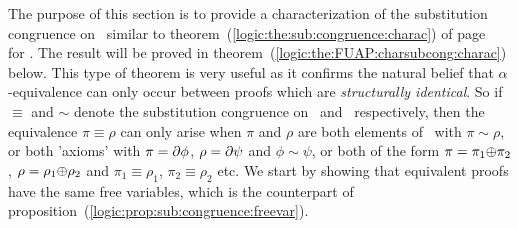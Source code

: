 The purpose of this section is to provide a characterization of the
substitution congruence on \pvs\ similar to
theorem~(\ref{logic:the:sub:congruence:charac}) of
page~\pageref{logic:the:sub:congruence:charac} for \pv. The result
will be proved in theorem~(\ref{logic:the:FUAP:charsubcong:charac})
below. This type of theorem is very useful as it confirms the
natural belief that $\alpha$-equivalence can only occur between
proofs which are {\em structurally identical}. So if $\equiv$ and
$\sim$ denote the substitution congruence on \pvs\ and \pv\
respectively, then the equivalence $\pi\equiv\rho$ can only arise
when $\pi$ and $\rho$ are both elements of \pv\ with $\pi\sim\rho$,
or both 'axioms' with $\pi=\mbox{$\partial$}\phi$, $\rho=\mbox{$\partial$}\psi$ and
$\phi\sim\psi$, or both of the form $\pi=\pi_{1}\mbox{$\oplus$}\pi_{2}$,
$\rho=\rho_{1}\mbox{$\oplus$}\rho_{2}$ and $\pi_{1}\equiv\rho_{1}$,
$\pi_{2}\equiv\rho_{2}$ etc. We start by showing that equivalent
proofs have the same free variables, which is the counterpart of
proposition~(\ref{logic:prop:sub:congruence:freevar}).

